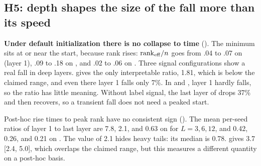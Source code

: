 \subsection{H5: depth shapes the size of the fall more than its speed}
\label{sec:h5}

\begin{table}[t]
    \centering
    \small
    \caption{Time to minimum rank as a fraction of training. The criterion needs a fall of at least 10\% in both layers. No run in any configuration satisfies this.}
    \label{tab:h5}
\end{table}

{\bf Under default initialization there is no collapse to time} (). The minimum sits at or near the start, because rank rises: $\mathrm{rank}_{\mathrm{eff}}/n$ goes from .04 to .07 on \agnews (layer 1), .09 to .18 on \sst, and .02 to .06 on \cifar. Three signal configurations show a real fall in deep layers.  gives the only interpretable ratio, 1.81, which is below the claimed range, and even there layer 1 falls only 7\%. In  and \bert, layer 1 hardly falls, so the ratio has little meaning. Without label signal, the last layer of  drops 37\% and then recovers, so a transient fall does not need a peaked start.

Post-hoc rise times to peak rank have no consistent sign (). The mean per-seed ratios of layer 1 to last layer are 7.8, 2.1, and 0.63 on \agnews for $L=3,6,12$, and 0.42, 0.26, and 0.21 on \cifar. The value of 2.1 hides heavy tails: its median is 0.78. \sst gives 3.7 [2.4, 5.0], which overlaps the claimed range, but this measures a different quantity on a post-hoc basis.

